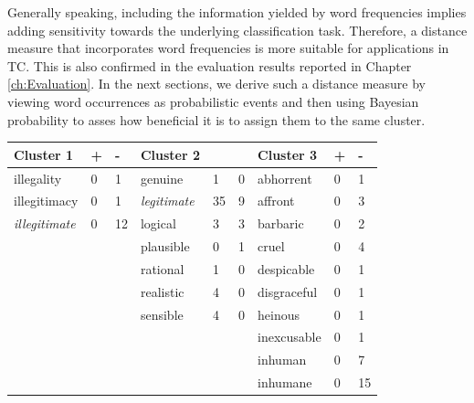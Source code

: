 Generally speaking, including the information yielded by word 
frequencies implies adding sensitivity towards the underlying classification
task. Therefore, a distance measure that incorporates word frequencies is more
suitable for applications in TC. This is also confirmed in the evaluation
results reported in Chapter \ref{ch:Evaluation}. 
In the next sections, we derive such a distance measure by viewing word
occurrences as probabilistic events and then using Bayesian probability to 
asses how beneficial it is to assign them to the same cluster.   
\begin{table}
\centering
\begin{tabular}{lll|lll|lll}
\textbf{Cluster 1} & \textbf{+} & \textbf{-} & \textbf{Cluster 2} & \textbf{}  & \textbf{}  & \textbf{Cluster 3} & \textbf{+} & \textbf{-} \\ \hline
illegality         & 0          & 1          & genuine            & 1          & 0          & abhorrent          & 0          & 1          \\
illegitimacy       & 0          & 1          & {\color[HTML]{FE0000} \textit{legitimate}}         & 35         & 9          & affront            & 0          & 3          \\
{\color[HTML]{FE0000} \textit{illegitimate}}           & 0          & 12         & logical            &3 & 3          & barbaric           & 0          & 2          \\
                   &            &            & plausible          & 0          & 1          & cruel              & 0          & 4          \\
                   &            &            & rational           & 1          & 0          & despicable         & 0          & 1          \\
                   &            &            & realistic          & 4          & 0          & disgraceful        & 0          & 1          \\
                   &            &            & sensible           & 4          & 0          & heinous            & 0          & 1          \\
                   &            &            &                    &            &            & inexcusable        & 0          & 1          \\
                   &            &            &                    &            &            & inhuman            & 0          & 7          \\
                   &            &            &                    &            &            & inhumane           & 0          & 15         \\

\end{tabular}
\end{table}
